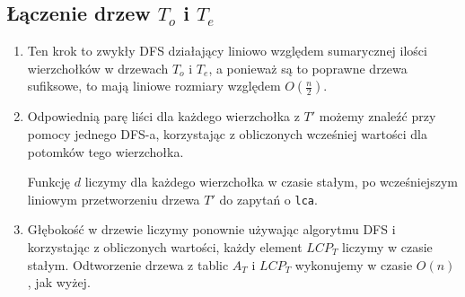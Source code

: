 \documentclass[a4paper,oneside,10pt]{book}
\begin{document}
\subsection*{Łączenie drzew $T_o$ i $T_e$}
\begin{enumerate}
\item Ten krok to zwykły DFS działający liniowo względem sumarycznej ilości wierzchołków w drzewach $T_o$ i $T_e$, a ponieważ są to poprawne drzewa sufiksowe, to mają liniowe rozmiary względem $O(\frac{n}{2})$.
\item Odpowiednią parę liści dla każdego wierzchołka z $T'$ możemy znaleźć przy pomocy jednego DFS-a, korzystając z obliczonych wcześniej wartości dla potomków tego wierzchołka.

Funkcję $d$ liczymy dla każdego wierzchołka w czasie stałym, po wcześniejszym liniowym przetworzeniu drzewa $T'$ do zapytań o \verb|lca|.
\item Głębokość w drzewie liczymy ponownie używając algorytmu DFS i korzystając z obliczonych wartości, każdy element $LCP_T$ liczymy w czasie stałym. Odtworzenie drzewa z tablic $A_T$ i $LCP_T$ wykonujemy w czasie $O(n)$, jak wyżej.
\end{enumerate}
\end{document}
